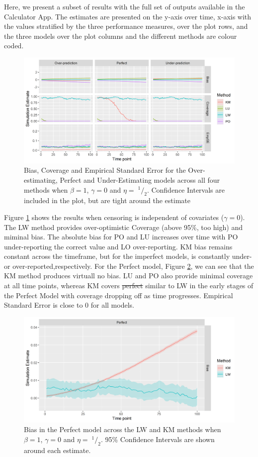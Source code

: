 \documentclass[12pt,PhD,twoside,openright]{muthesis}
\newcommand{\sfrac}[2]{\;^{#1}/_{#2}}
\begin{document}
Here, we present a subset of results with the full set of outputs available in the Calculator App. The estimates are presented on the y-axis over time, x-axis with the values stratified by the three performance measures, over the plot rows, and the three models over the plot columns and the different methods are colour coded.
\begin{figure}
\centering
\includegraphics{figure/IPCW_Logistic/MainPlot_b(1)_g(0)_e(0.5).png}
\caption{\label{fig:MainPlotg0}Bias, Coverage and Empirical Standard Error for the Over-estimating, Perfect and Under-Estimating models across all four methods when \(\beta=1\), \(\gamma=0\) and \(\eta=\sfrac{1}{2}\). Confidence Intervals are included in the plot, but are tight around the estimate}
\end{figure}
Figure \ref{fig:MainPlotg0} shows the results when censoring is independent of covariates (\(\gamma=0\)). The LW method provides over-optimistic Coverage (above 95\%, too high) and miminal bias. The absolute bias for PO and LU increases over time with PO under-reporting the correct value and LO over-reporting. KM bias remains constant across the timeframe, but for the imperfect models, is constantly under- or over-reported,respectively. For the Perfect model, Figure \ref{fig:BiasPlotg0}, we can see that the KM method produces virtuall no bias. LU and PO also provide minimal coverage at all time points, whereas KM covers \sout{perfect} similar to LW in the early stages of the Perfect Model with coverage dropping off as time progresses. Empirical Standard Error is close to 0 for all models.
\begin{figure}
\centering
\includegraphics{figure/IPCW_Logistic/Bias_b(1)_g(0)_e(0.5).png}
\caption{\label{fig:BiasPlotg0}Bias in the Perfect model across the LW and KM methods when \(\beta=1\), \(\gamma=0\) and \(\eta=\sfrac{1}{2}\). 95\% Confidence Intervals are shown around each estimate.}
\end{figure}
\end{document}
